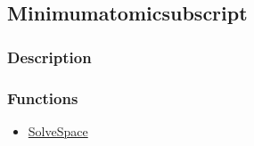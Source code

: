 \subsection{Minimumatomicsubscript}\label{Minimumatomicsubscript}
\subsubsection{Description}


\subsubsection{Functions}
\begin{itemize}
\item \hyperref[SolveSpace]{SolveSpace}
\end{itemize}


